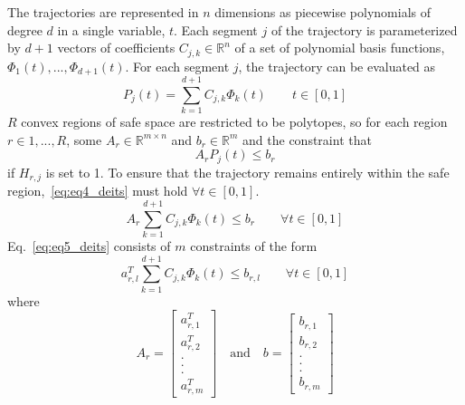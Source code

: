 The trajectories are represented in $n$ dimensions as piecewise
polynomials of degree $d$ in a single variable, $t$. Each segment
$j$ of the trajectory is parameterized by $d + 1$ vectors of
coefficients $C_{j,k} \in \mathbb{R}^n$  of a set of polynomial basis functions, $\Phi_{1}(t), ... , \Phi_{d+1}(t)$. For each segment $j$, the trajectory can be evaluated as\begin{equation} \label{eq:Pjt_eq3_deits}
P_{j}(t) = \sum_{k=1}^{d+1} C_{j,k} \Phi_{k} (t) \quad \quad t \in [0,1]
\end{equation} $R$ convex regions of safe space are restricted to be
polytopes, so for each region $r \in 1, . . . , R$, some
$A_r \in \mathbb{R}^{m \times n}$ and $b_r \in \mathbb{R}^{m}$ and the constraint that\begin{equation} \label{eq:eq4_deits}
A_{r}P_j(t) \leq b_r
\end{equation}if $H_{r,j}$ is set to 1. To ensure that the trajectory remains
entirely within the safe region,~\ref{eq:eq4_deits} must hold $\forall t \in [0, 1]$.  \begin{equation} \label{eq:eq5_deits}
A_{r}\sum_{k=1}^{d+1} C_{j,k} \Phi_k(t) \leq b_{r} \quad \quad \forall t \in [0,1]
\end{equation}
Eq.~\ref{eq:eq5_deits} consists of $m$ constraints of the form\begin{equation} \label{eq:eq6_deits}
a_{r,l}^{T}\sum_{k=1}^{d+1} C_{j,k} \Phi_k(t) \leq b_{r,l} \quad \quad \forall t \in [0,1]
\end{equation}where \begin{equation} \label{eq:eq7_deits}
A_r = \begin{bmatrix}a_{r,1}^{T}
\\ a_{r,2}^{T}
\\ .
\\ .
\\ .
\\ a_{r,m}^{T}
\end{bmatrix} \quad \text{and} \quad b = \begin{bmatrix}b_{r,1}
\\ b_{r,2}
\\ .
\\ .
\\ .
\\ b_{r,m}
\end{bmatrix}
\end{equation}

